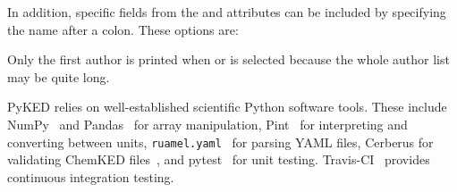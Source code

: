 \documentclass[12pt]{ussci}
\newcommand\ck{ChemKED}
\newcommand\pk{PyKED}
\begin{document}
\noindent\begin{itemize*}
    \item {}
    \item {}
    \item {}
    \item {}
    \item {}
    \item {}
    \item {}
    \item {}
    \item {}
    \item {}
    \item {}
\end{itemize*}

In addition, specific fields from the  and 
attributes can be included by specifying the name after a colon. These options
are:

\noindent\begin{itemize*}
    \item {}
    \item {}
    \item {}
    \item {}
    \item {}
    \item {}
    \item {}
    \item {}
\end{itemize*}

\noindent\begin{itemize*}
    \item {}
    \item {}
\end{itemize*}

Only the first author is printed when  or
 is selected because the whole author list may be
quite long.

\pk{} relies on well-established scientific Python software tools. These include
NumPy~\autocite{vanderWalt:2011np} and Pandas~\autocite{pandas,McKinney2010} for
array manipulation, Pint~\autocite{Grecco2016} for interpreting and converting
between units, \texttt{ruamel.yaml}~\autocite{ruamel_yaml} for parsing YAML
files, Cerberus for validating \ck{} files~\autocite{cerberus}, and
pytest~\autocite{pytest:3.0.1} for unit testing. Travis-CI~\autocite{Travis2016}
provides continuous integration testing.
\end{document}
